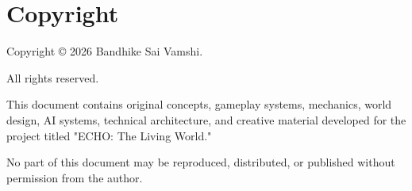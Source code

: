 \thispagestyle{empty}

\chapter*{Copyright}

Copyright © 2026 Bandhike Sai Vamshi.

All rights reserved.

This document contains original concepts, gameplay systems, mechanics, world design, AI systems, technical architecture, and creative material developed for the project titled "ECHO: The Living World."

No part of this document may be reproduced, distributed, or published without permission from the author.

\clearpage